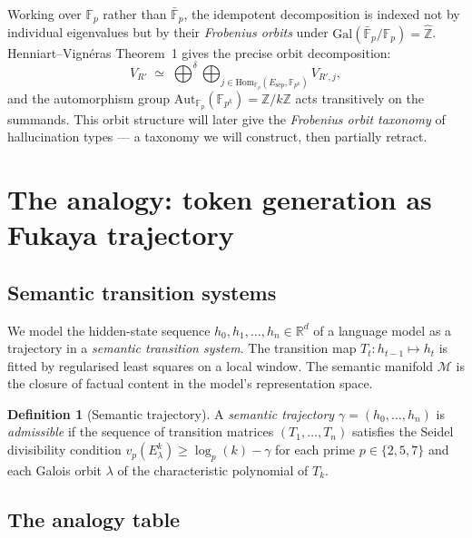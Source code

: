 \documentclass[11pt]{amsart}
\theoremstyle{definition}
\newtheorem{definition}[theorem]{Definition}
\begin{document}
Working over $\mathbb{F}_p$ rather than $\bar{\mathbb{F}}_p$, the idempotent
decomposition is indexed not by individual eigenvalues but by their
\emph{Frobenius orbits} under $\mathrm{Gal}(\bar{\mathbb{F}}_p/\mathbb{F}_p) = \hat{\mathbb{Z}}$.
Henniart--Vign\'eras Theorem~1 \cite{HV17} gives the precise orbit decomposition:
\[
  V_{R'} \;\simeq\; \bigoplus^\delta \bigoplus_{j \in \mathrm{Hom}_{\mathbb{F}_p}(E_{\mathrm{sep}}, \mathbb{F}_{p^k})} V_{R',j},
\]
and the automorphism group $\mathrm{Aut}_{\mathbb{F}_p}(\mathbb{F}_{p^k}) = \mathbb{Z}/k\mathbb{Z}$
acts transitively on the summands.
This orbit structure will later give the \emph{Frobenius orbit taxonomy}
of hallucination types --- a taxonomy we will construct, then partially retract.

\section{The analogy: token generation as Fukaya trajectory}
\label{sec:analogy}

\subsection{Semantic transition systems}

We model the hidden-state sequence $h_0, h_1, \ldots, h_n \in \mathbb{R}^d$
of a language model as a trajectory in a \emph{semantic transition system}.
The transition map $T_t: h_{t-1} \mapsto h_t$ is fitted by regularised
least squares on a local window.
The semantic manifold $\mathcal{M}$ is the closure of factual content
in the model's representation space.

\begin{definition}[Semantic trajectory]
A \emph{semantic trajectory} $\gamma = (h_0, \ldots, h_n)$ is
\emph{admissible} if the sequence of transition matrices
$(T_1, \ldots, T_n)$ satisfies the Seidel divisibility condition
$v_p(E_\lambda^k) \geq \log_p(k) - \gamma$ for each prime $p \in \{2,5,7\}$
and each Galois orbit $\lambda$ of the characteristic polynomial of $T_k$.
\end{definition}

\subsection{The analogy table}
\end{document}
